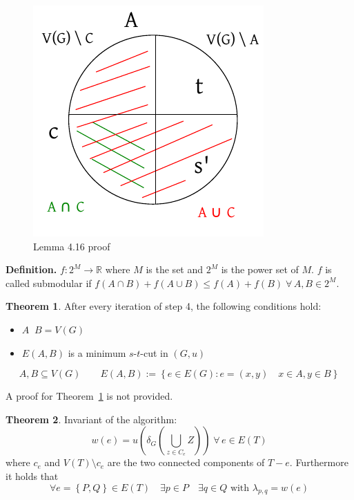 \documentclass[a4paper]{article}
\theoremstyle{definition}
\newtheorem{theorem}{Theorem}
\newcommand{\set}[1]{\left\{#1\right\}}
\newcommand{\fall}{\;\forall\,}
\newcommand{\noproof}[1]{A proof for Theorem~\ref{#1} is not provided.}
\begin{document}
\begin{figure}[ht]
 \begin{center}
  \includegraphics{img/lemma_4_16_proof.pdf}
  \caption{Lemma 4.16 proof}
 \end{center}
\end{figure}

\textbf{Definition.}
  $f: 2^M \rightarrow \mathbb{R}$ where $M$ is the set and $2^M$ is the power set of $M$.
  $f$ is called submodular if $f(A \cap B) + f(A \cup B) \leq f(A) + f(B) \fall A, B \in 2^M$.

\begin{theorem}\label{lemma-4.17}
  After every iteration of step 4, the following conditions hold:
  \begin{itemize}
    \item $A \mathop{\dot{\cup}} B = V(G)$
    \item $E(A, B)$ is a minimum $s$-$t$-cut in $(G, u)$
  \end{itemize}
  \[
    A, B \subseteq V(G)  \qquad  E(A, B) := \set{e \in E(G): e = (x, y) \quad x \in A, y \in B}
  \]
\end{theorem}

\noproof{lemma-4.17}

\begin{theorem}\label{lemma-4.18}
  Invariant of the algorithm:
  \[
    w(e) = u(\delta_G(\bigcup_{z \in C_e} Z)) \fall e \in E(T)
  \]
  where $c_e$ and $V(T) \setminus c_e$ are the two connected components of $T - e$.
  Furthermore it holds that
  \[
    \forall e = \set{P, Q} \in E(T)
      \quad \exists p \in P
      \quad \exists q \in Q \text{ with } \lambda_{p,q} = w(e)
  \]
\end{theorem}
\end{document}
